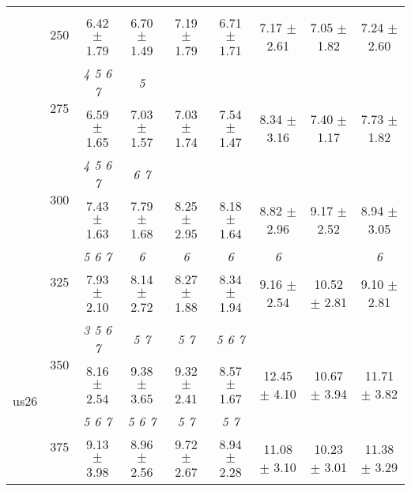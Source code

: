 \begin{table}[h]
{\begin{tabular}{
        ccccccccc}
 & \multirow{2}{*}{250}& & & & & & &  \\ 
 & & 6.42 $\pm$ 1.79& 6.70 $\pm$ 1.49& 7.19 $\pm$ 1.79& 6.71 $\pm$ 1.71& 7.17 $\pm$ 2.61& 7.05 $\pm$ 1.82& 7.24 $\pm$ 2.60 \\ 
 & \multirow{2}{*}{275}& \cellcolor[HTML]{EFEFEF} \textit{ 4 5 6 7 }& \cellcolor[HTML]{EFEFEF} \textit{ 5 }& \cellcolor[HTML]{EFEFEF} & \cellcolor[HTML]{EFEFEF} & \cellcolor[HTML]{EFEFEF} & \cellcolor[HTML]{EFEFEF} & \cellcolor[HTML]{EFEFEF}  \\ 
 & & \cellcolor[HTML]{EFEFEF} 6.59 $\pm$ 1.65& \cellcolor[HTML]{EFEFEF} 7.03 $\pm$ 1.57& \cellcolor[HTML]{EFEFEF} 7.03 $\pm$ 1.74& \cellcolor[HTML]{EFEFEF} 7.54 $\pm$ 1.47& \cellcolor[HTML]{EFEFEF} 8.34 $\pm$ 3.16& \cellcolor[HTML]{EFEFEF} 7.40 $\pm$ 1.17& \cellcolor[HTML]{EFEFEF} 7.73 $\pm$ 1.82 \\ 
 & \multirow{2}{*}{300}& \textit{ 4 5 6 7 }& \textit{ 6 7 }& & & & &  \\ 
 & & 7.43 $\pm$ 1.63& 7.79 $\pm$ 1.68& 8.25 $\pm$ 2.95& 8.18 $\pm$ 1.64& 8.82 $\pm$ 2.96& 9.17 $\pm$ 2.52& 8.94 $\pm$ 3.05 \\ 
 & \multirow{2}{*}{325}& \cellcolor[HTML]{EFEFEF} \textit{ 5 6 7 }& \cellcolor[HTML]{EFEFEF} \textit{ 6 }& \cellcolor[HTML]{EFEFEF} \textit{ 6 }& \cellcolor[HTML]{EFEFEF} \textit{ 6 }& \cellcolor[HTML]{EFEFEF} \textit{ 6 }& \cellcolor[HTML]{EFEFEF} & \cellcolor[HTML]{EFEFEF} \textit{ 6 } \\ 
 & & \cellcolor[HTML]{EFEFEF} 7.93 $\pm$ 2.10& \cellcolor[HTML]{EFEFEF} 8.14 $\pm$ 2.72& \cellcolor[HTML]{EFEFEF} 8.27 $\pm$ 1.88& \cellcolor[HTML]{EFEFEF} 8.34 $\pm$ 1.94& \cellcolor[HTML]{EFEFEF} 9.16 $\pm$ 2.54& \cellcolor[HTML]{EFEFEF} 10.52 $\pm$ 2.81& \cellcolor[HTML]{EFEFEF} 9.10 $\pm$ 2.81 \\ 
 \multirow{4}{*}{us26} & \multirow{2}{*}{350}& \textit{ 3 5 6 7 }& \textit{ 5 7 }& \textit{ 5 7 }& \textit{ 5 6 7 }& & &  \\ 
 & & 8.16 $\pm$ 2.54& 9.38 $\pm$ 3.65& 9.32 $\pm$ 2.41& 8.57 $\pm$ 1.67& 12.45 $\pm$ 4.10& 10.67 $\pm$ 3.94& 11.71 $\pm$ 3.82 \\ 
 & \multirow{2}{*}{375}& \cellcolor[HTML]{EFEFEF} \textit{ 5 6 7 }& \cellcolor[HTML]{EFEFEF} \textit{ 5 6 7 }& \cellcolor[HTML]{EFEFEF} \textit{ 5 7 }& \cellcolor[HTML]{EFEFEF} \textit{ 5 7 }& \cellcolor[HTML]{EFEFEF} & \cellcolor[HTML]{EFEFEF} & \cellcolor[HTML]{EFEFEF}  \\ 
 & & \cellcolor[HTML]{EFEFEF} 9.13 $\pm$ 3.98& \cellcolor[HTML]{EFEFEF} 8.96 $\pm$ 2.56& \cellcolor[HTML]{EFEFEF} 9.72 $\pm$ 2.67& \cellcolor[HTML]{EFEFEF} 8.94 $\pm$ 2.28& \cellcolor[HTML]{EFEFEF} 11.08 $\pm$ 3.10& \cellcolor[HTML]{EFEFEF} 10.23 $\pm$ 3.01& \cellcolor[HTML]{EFEFEF} 11.38 $\pm$ 3.29 \\ 

\end{tabular}}
\end{table}
